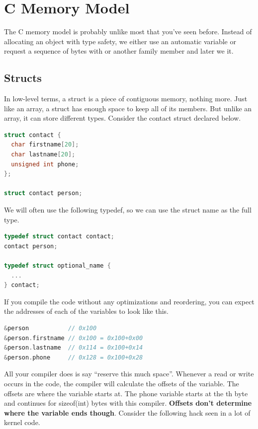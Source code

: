 \section{C Memory Model}

The C memory model is probably unlike most that you've seen before. Instead of allocating an object with type safety, we either use an automatic variable or request a sequence of bytes with  or another family member and later we  it.

\subsection{Structs}

In low-level terms, a struct is a piece of contiguous memory, nothing more.
Just like an array, a struct has enough space to keep all of its members.
But unlike an array, it can store different types. Consider the contact struct declared below.

\begin{lstlisting}[language=C]
struct contact {
  char firstname[20];
  char lastname[20];
  unsigned int phone;
};

struct contact person;
\end{lstlisting}

We will often use the following typedef, so we can use the struct name as the full type.

\begin{lstlisting}[language=C]
typedef struct contact contact;
contact person;

typedef struct optional_name {
  ...
} contact;
\end{lstlisting}

If you compile the code without any optimizations and reordering, you can expect the addresses of each of the variables to look like this.

\begin{lstlisting}[language=C]
&person           // 0x100
&person.firstname // 0x100 = 0x100+0x00
&person.lastname  // 0x114 = 0x100+0x14
&person.phone     // 0x128 = 0x100+0x28
\end{lstlisting}

All your compiler does is say ``reserve this much space''.
Whenever a read or write occurs in the code, the compiler will calculate the offsets of the variable.
The offsets are where the variable starts at.
The phone variable starts at the th byte and continues for sizeof(int) bytes with this compiler.
\textbf{Offsets don't determine where the variable ends though}.
Consider the following hack seen in a lot of kernel code.

